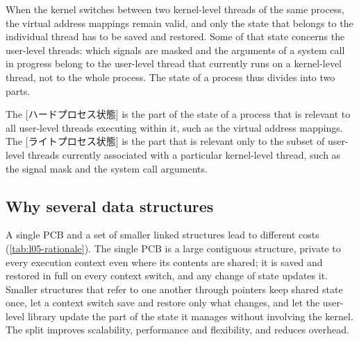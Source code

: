 \documentclass[../main.tex]{subfiles}
\begin{document}
When the kernel switches between two kernel-level threads of the same
process, the virtual address mappings remain valid, and only the state
that belongs to the individual thread has to be saved and restored.  Some
of that state concerns the user-level threads: which signals are masked
and the arguments of a system call in progress belong to the user-level
thread that currently runs on a kernel-level thread, not to the whole
process.  The state of a process thus divides into two parts.

\begin{definition}
  The [ハードプロセス状態] is the part of the
  state of a process that is relevant to all user-level threads executing
  within it, such as the virtual address mappings.  The
  [ライトプロセス状態] is the part that is
  relevant only to the subset of user-level threads currently associated
  with a particular kernel-level thread, such as the signal mask and the
  system call arguments.
\end{definition}

\subsection{Why several data structures}

A single PCB and a set of smaller linked structures lead to different
costs (\cref{tab:l05-rationale}).  The single PCB is a large contiguous
structure, private to every execution context even where its contents are
shared; it is saved and restored in full on every context switch, and any
change of state updates it.  Smaller structures that refer to one another
through pointers keep shared state once, let a context switch save and
restore only what changes, and let the user-level library update the part
of the state it manages without involving the kernel.  The split improves
scalability, performance and flexibility, and reduces overhead.
\end{document}

